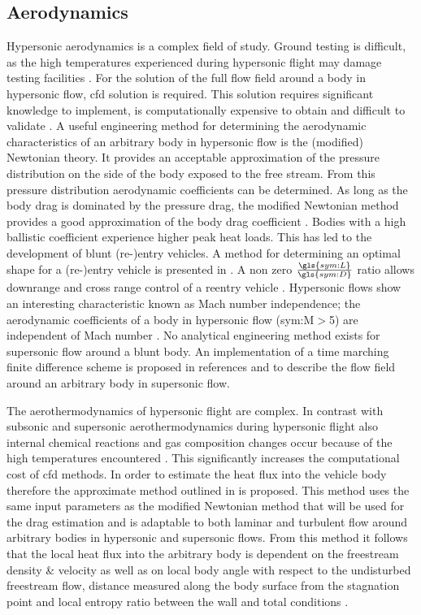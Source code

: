 \subsection{Aerodynamics} \label{sec:aero}
Hypersonic aerodynamics is a complex field of study. Ground testing is difficult, as the high temperatures experienced during hypersonic flight may damage testing facilities \cite{AndersonJr.2006, Bertin1994}. For the solution of the full flow field around a body in hypersonic flow, \gls{cfd} solution is required. This solution requires significant knowledge to implement, is computationally expensive to obtain and difficult to validate \cite{AndersonJr.2006, Bertin1994}. A useful engineering method for determining the aerodynamic characteristics of an arbitrary body in hypersonic flow is the (modified) Newtonian theory. It provides an acceptable approximation of the pressure distribution on the side of the body exposed to the free stream. From this pressure distribution aerodynamic coefficients can be determined. As long as the body drag is dominated by the pressure drag, the modified Newtonian method provides a good approximation of the body drag coefficient \cite{AndersonJr.2006, Bertin1994, Bertin2006}. Bodies with a high ballistic coefficient experience higher peak heat loads. This has led to the development of blunt (re-)entry vehicles\cite{Bertin1994,Theisinger2009}. A method for determining an optimal shape for a (re-)entry vehicle is presented in \cite{Theisinger2009}. A non zero $\frac{\gls{sym:L}}{\gls{sym:D}}$ ratio allows downrange and cross range control of a reentry vehicle \cite{Theisinger2009}. Hypersonic flows show an interesting characteristic known as Mach number independence; the aerodynamic coefficients of a body in hypersonic flow (\gls{sym:M}$>$5) are independent of Mach number \cite{Bertin1994,AndersonJr.2007,Hollis}. No analytical engineering method exists for supersonic flow around a blunt body. An implementation of a time marching finite difference scheme is proposed in references \cite{AndersonJr.2007} and \cite{AndersonJr.2006} to describe the flow field around an arbitrary body in supersonic flow. 

The aerothermodynamics of hypersonic flight are complex. In contrast with subsonic and supersonic aerothermodynamics during hypersonic flight also internal chemical reactions and gas composition changes occur  because of the high temperatures encountered \cite{AndersonJr.2006}. This significantly increases the computational cost of \gls{cfd} methods. In order to estimate the heat flux into the vehicle body therefore the approximate method outlined in \cite{Tauber1986} \cite{AndersonJr.2006} is proposed. This method uses the same input parameters as the modified Newtonian method that will be used for the drag estimation and is adaptable to both laminar and turbulent flow around arbitrary bodies in hypersonic and supersonic flows. From this method it follows that the local heat flux into the arbitrary body is dependent on the freestream density \& velocity as well as on local body angle with respect to the undisturbed freestream flow, distance measured along the body surface from the stagnation point and local entropy ratio between the wall and total conditions \cite{Tauber1986, AndersonJr.2006}.